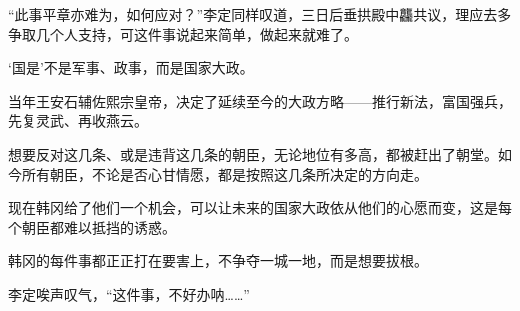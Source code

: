 “此事平章亦难为，如何应对？”李定同样叹道，三日后垂拱殿中龘共议，理应去多争取几个人支持，可这件事说起来简单，做起来就难了。

‘国是’不是军事、政事，而是国家大政。

当年王安石辅佐熙宗皇帝，决定了延续至今的大政方略——推行新法，富国强兵，先复灵武、再收燕云。

想要反对这几条、或是违背这几条的朝臣，无论地位有多高，都被赶出了朝堂。如今所有朝臣，不论是否心甘情愿，都是按照这几条所决定的方向走。

现在韩冈给了他们一个机会，可以让未来的国家大政依从他们的心愿而变，这是每个朝臣都难以抵挡的诱惑。

韩冈的每件事都正正打在要害上，不争夺一城一地，而是想要拔根。

李定唉声叹气，“这件事，不好办呐……”
